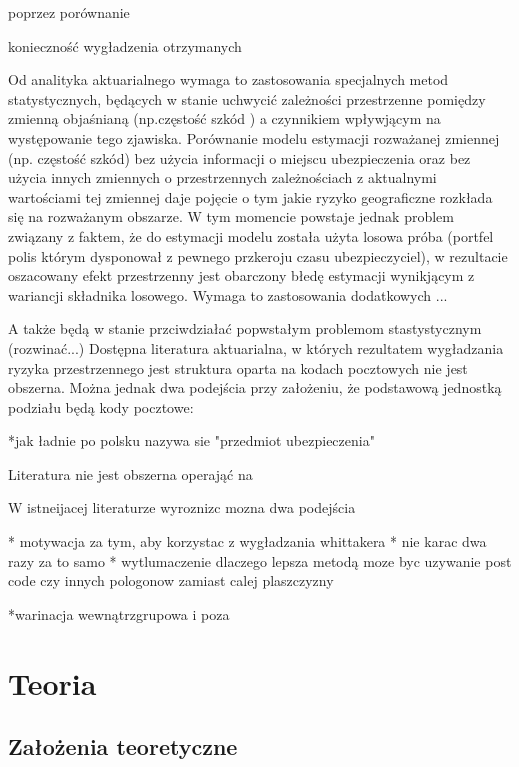 \documentclass[polish, twoside, 12pt, a4paper]{article}
\theoremstyle{definition}
\theoremstyle{plain}
\theoremstyle{remark}
\begin{document}
poprzez porównanie 

konieczność wygładzenia otrzymanych

Od analityka aktuarialnego wymaga to zastosowania specjalnych metod statystycznych, będących w stanie uchwycić zależności przestrzenne pomiędzy zmienną objaśnianą (np.częstość szkód ) a czynnikiem wpływjącym na występowanie tego zjawiska. Porównanie modelu estymacji rozważanej zmiennej (np. częstość szkód) bez użycia informacji o miejscu ubezpieczenia oraz bez użycia innych zmiennych o przestrzennych zależnościach z aktualnymi wartościami tej zmiennej daje pojęcie o tym jakie ryzyko geograficzne rozkłada się na rozważanym obszarze. W tym momencie powstaje jednak problem związany z faktem, że do estymacji modelu została użyta losowa próba (portfel polis którym dysponował z pewnego przkeroju czasu ubezpieczyciel), w rezultacie oszacowany efekt przestrzenny jest obarczony błedę estymacji wynikjącym z wariancji składnika losowego. Wymaga to zastosowania dodatkowych ...



A także będą w stanie przciwdziałać popwstałym problemom stastystycznym (rozwinać...)
Dostępna literatura aktuarialna, w których rezultatem wygładzania ryzyka przestrzennego jest struktura oparta na kodach pocztowych nie jest obszerna. Można jednak dwa podejścia przy założeniu, że podstawową jednostką podziału będą kody pocztowe:


 *jak ładnie po polsku nazywa sie "przedmiot ubezpieczenia"





Literatura nie jest obszerna operająć na 

W istneijacej literaturze wyroznizc mozna dwa podejścia

* motywacja za tym, aby korzystac z wygładzania whittakera
* nie karac dwa razy za to samo
* wytlumaczenie dlaczego lepsza metodą moze byc uzywanie  post code czy innych pologonow zamiast calej plaszczyzny 

*warinacja wewnątrzgrupowa i poza 



\clearpage
\section{Teoria}
\subsection{Założenia teoretyczne}
\end{document}
